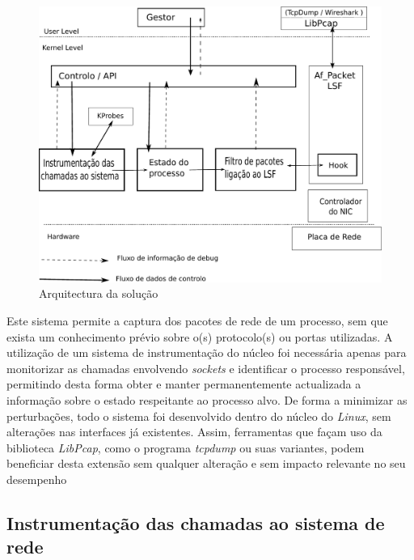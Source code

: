 \documentclass[a4paper]{llncs}
\begin{document}
\begin{figure}[htbp]
\begin{center}
\includegraphics[scale=0.5]{interface.pdf} 
\caption{Arquitectura da solução}
\label{arquitectura}
\end{center}
\end{figure}


Este sistema permite a captura dos pacotes de rede de um processo, sem que exista um conhecimento prévio sobre o(s) protocolo(s) ou portas utilizadas.
 A utilização de um sistema de instrumentação do núcleo foi necessária apenas para monitorizar as chamadas envolvendo \emph{sockets} e identificar o processo responsável, permitindo desta forma obter e manter permanentemente actualizada a informação sobre o estado respeitante ao processo alvo.
 De forma a minimizar as perturbações, todo o sistema foi desenvolvido dentro do núcleo do \textit{Linux}, sem alterações nas interfaces já existentes.
 Assim, ferramentas que façam uso da biblioteca \textit{LibPcap}, como o programa \textit{tcpdump} ou suas variantes, podem beneficiar desta extensão sem qualquer alteração e sem impacto relevante no seu desempenho



\subsection*{Instrumentação das chamadas ao sistema de rede}
\label{sub:mon_syscalls}
\end{document}
